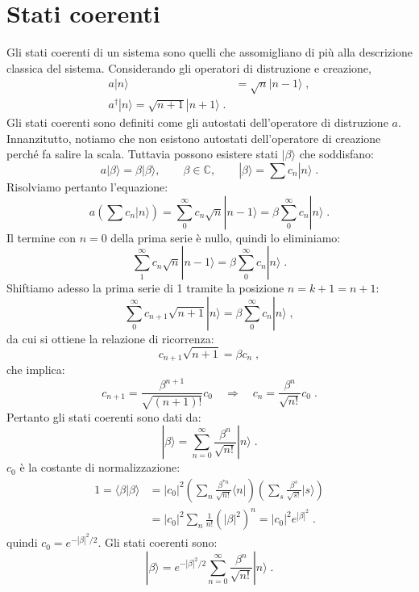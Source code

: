 \documentclass[10pt,a4paper]{report}
\theoremstyle{definition}
\numberwithin{equation}{section}
\newcommand{\bra}{\langle}
\newcommand{\ket}{\rangle}
\newcommand{\adj}[1]{#1^{\dagger}}
\begin{document}
\section{Stati coerenti}
Gli stati coerenti di un sistema sono quelli che assomigliano di più alla descrizione classica del sistema. Considerando gli operatori di distruzione e creazione,
\begin{align*}
a|n\ket &=\sqrt{n}|n-1\ket\;, \\
\adj{a}|n\ket=\sqrt{n+1}|n+1\ket\;.
\end{align*}
Gli stati coerenti sono definiti come gli autostati dell'operatore di distruzione $a$. Innanzitutto, notiamo che non esistono autostati dell'operatore di creazione perché fa salire la scala. Tuttavia possono esistere stati $|\beta\ket$ che soddisfano:
$$
a|\beta\ket=\beta|\beta\ket,\qquad \beta\in\mathbb{C},\qquad |\beta\ket=\sum c_n|n\ket\;.
$$
Risolviamo pertanto l'equazione:
\begin{equation}
a\left(\sum c_n|n\ket\right)= \sum_0^{\infty} c_n\sqrt{n}|n-1\ket=\beta\sum_0^{\infty} c_n|n\ket\;.
\end{equation}
Il termine con $n=0$ della prima serie è nullo, quindi lo eliminiamo:
$$
\sum_1^{\infty} c_n\sqrt{n}|n-1\ket=\beta\sum_0^{\infty} c_n|n\ket\;.
$$
Shiftiamo adesso la prima serie di 1 tramite la posizione $n=k+1=n+1$:
$$
\sum_0^{\infty} c_{n+1}\sqrt{n+1}|n\ket=\beta\sum_0^{\infty} c_n|n\ket\;,
$$
da cui si ottiene la relazione di ricorrenza:
\begin{equation}
c_{n+1}\sqrt{n+1}=\beta c_n\;,
\end{equation}
che implica:
\begin{equation}
c_{n+1}=\frac{\beta^{n+1}}{\sqrt{(n+1)!}}c_0\quad \Longrightarrow\quad c_n=\frac{\beta^n}{\sqrt{n!}}c_0\;.
\end{equation}
Pertanto gli stati coerenti sono dati da:
\begin{equation}
|\beta\ket=\sum_{n=0}^{\infty}\frac{\beta^n}{\sqrt{n!}}|n\ket\;.
\end{equation}
$c_0$ è la costante di normalizzazione:
\begin{align*}
1=\bra\beta|\beta\ket &= |c_0|^2\left(\sum_n \frac{\beta^{*n}}{\sqrt{n!}}\bra n|\right)\left(\sum_s \frac{\beta^s}{\sqrt{s!}}|s\ket\right) \\
&= |c_0|^2\sum_n \frac{1}{n!}(|\beta|^2)^n= |c_0|^2 e^{|\beta|^2}\;.
\end{align*}
quindi $c_0=e^{-|\beta|^2/2}$. Gli stati coerenti sono:
\begin{equation}
|\beta\ket=e^{-|\beta|^2/2}\sum_{n=0}^{\infty}\frac{\beta^n}{\sqrt{n!}}|n\ket\;.
\end{equation}
\end{document}
